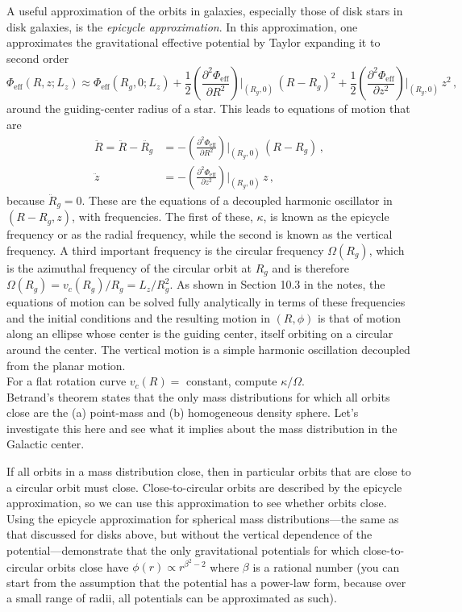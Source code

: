 \documentclass[12pt]{article}
\begin{document}
A useful approximation of the orbits in galaxies,
especially those of disk stars in disk galaxies, is the \emph{epicycle
  approximation}. In this approximation, one approximates the
gravitational effective potential by Taylor expanding it to second order
\begin{equation}
    \Phi_\mathrm{eff}(R,z;L_z) \approx \Phi_\mathrm{eff}(R_g,0;L_z)
            + \frac{1}{2}\left(\frac{\partial^2 \Phi_\mathrm{eff}}{\partial R^2}\right)\Bigg|_{(R_g,0)}\,(R-R_g)^2
            +\frac{1}{2}\left(\frac{\partial^2 \Phi_\mathrm{eff}}{\partial z^2}\right)\Bigg|_{(R_g,0)}\,z^2\,,
\end{equation}
around the guiding-center radius of a star. This leads to equations of
motion that are
\begin{align}
   \ddot{R} = \ddot{R}-\ddot{R_g} &= -\left(\frac{\partial^2 \Phi_\mathrm{eff}}{\partial R^2}\right)\Bigg|_{(R_g,0)}\,(R-R_g)\,,\\
   \ddot{z} & =  -\left(\frac{\partial^2 \Phi_\mathrm{eff}}{\partial z^2}\right)\Bigg|_{(R_g,0)}\,z\,,
\end{align}
because $\ddot{R}_g = 0$. These are the equations of a decoupled
harmonic oscillator in $(R-R_g,z)$, with frequencies. The first of
these, $\kappa$, is known as the epicycle frequency or as the radial
frequency, while the second is known as the vertical frequency. A
third important frequency is the circular frequency $\Omega(R_g)$,
which is the azimuthal frequency of the circular orbit at $R_g$ and is
therefore $\Omega(R_g)=v_c(R_g)/R_g=L_z/R^2_g$. As shown in Section
10.3 in the notes, the equations of motion can be solved fully
analytically in terms of these frequencies and the initial conditions
and the resulting motion in $(R,\phi)$ is that of motion along an
ellipse whose center is the guiding center, itself orbiting on a
circular around the center. The vertical motion is a simple harmonic
oscillation decoupled from the planar motion.\\

 For a flat rotation curve $v_c(R) = $ constant,
compute $\kappa/\Omega$.\\

 Betrand's theorem states that the only mass
distributions for which all orbits close are the (a) point-mass and
(b) homogeneous density sphere. Let's investigate this here and see
what it implies about the mass distribution in the Galactic center.

If all orbits in a mass distribution close, then in particular orbits
that are close to a circular orbit must close. Close-to-circular
orbits are described by the epicycle approximation, so we can use this
approximation to see whether orbits close. Using the epicycle
approximation for spherical mass distributions---the same as that
discussed for disks above, but without the vertical dependence of the
potential---demonstrate that the only gravitational potentials for
which close-to-circular orbits close have $\phi(r) \propto
r^{\beta^2-2}$ where $\beta$ is a rational number (you can start from
the assumption that the potential has a power-law form, because over a
small range of radii, all potentials can be approximated as such).\\
\end{document}
